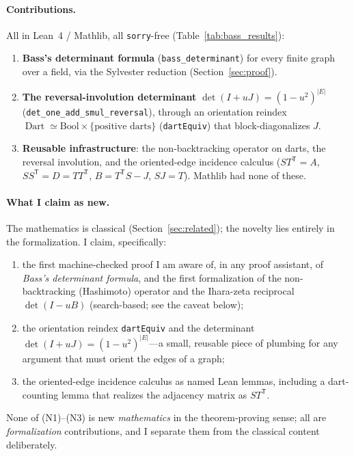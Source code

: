 \documentclass[11pt]{article}
\newcommand{\lean}[1]{\texttt{#1}}
\DeclareMathOperator{\Dart}{Dart}
\begin{document}
\paragraph{Contributions.} All in Lean~4 / Mathlib, all \lean{sorry}-free
(Table~\ref{tab:bass_results}):
\begin{enumerate}\itemsep2pt
\item \textbf{Bass's determinant formula} (\lean{bass\_determinant}) for every finite graph over a
  field, via the Sylvester reduction (Section~\ref{sec:proof}).
\item \textbf{The reversal-involution determinant} $\det(I+uJ)=(1-u^2)^{|E|}$
  (\lean{det\_one\_add\_smul\_reversal}), through an orientation reindex
  $\Dart\simeq\mathrm{Bool}\times\{\text{positive darts}\}$ (\lean{dartEquiv}) that
  block-diagonalizes $J$.
\item \textbf{Reusable infrastructure}: the non-backtracking operator on darts, the reversal
  involution, and the oriented-edge incidence calculus
  ($S T^{\mathsf T}=A$, $S S^{\mathsf T}=D=T T^{\mathsf T}$, $B=T^{\mathsf T}S-J$, $SJ=T$).
  Mathlib had none of these.
\end{enumerate}

\paragraph{What I claim as new.} The mathematics is classical (Section~\ref{sec:related}); the
novelty lies entirely in the formalization. I claim, specifically:
\begin{enumerate}\itemsep1.5pt
\item[(N1)] the first machine-checked proof I am aware of, in any proof assistant, of \emph{Bass's
  determinant formula}, and the first formalization of the non-backtracking (Hashimoto) operator and
  the Ihara-zeta reciprocal $\det(I-uB)$ (search-based; see the caveat below);
\item[(N2)] the orientation reindex \lean{dartEquiv} and the determinant
  $\det(I+uJ)=(1-u^2)^{|E|}$---a small, reusable piece of plumbing for any argument that must orient
  the edges of a graph;
\item[(N3)] the oriented-edge incidence calculus as named Lean lemmas, including a dart-counting
  lemma that realizes the adjacency matrix as $S T^{\mathsf T}$.
\end{enumerate}
None of (N1)--(N3) is new \emph{mathematics} in the theorem-proving sense; all are
\emph{formalization} contributions, and I separate them from the classical content deliberately.
\end{document}
